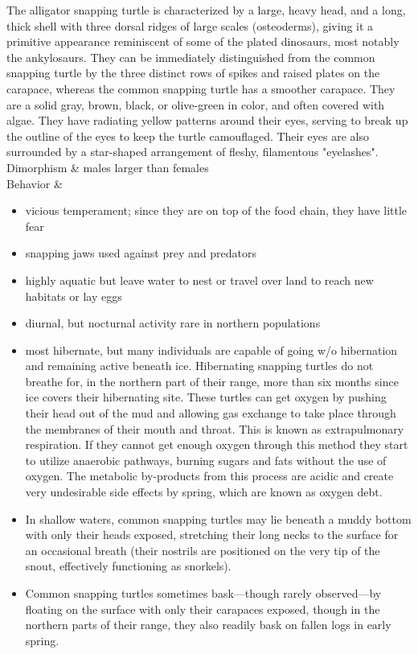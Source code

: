 \begin{center}
\begin{longtabu}
	The alligator snapping turtle is characterized by a large, heavy head, and a long, thick shell with three dorsal ridges of large scales (osteoderms), giving it a primitive appearance reminiscent of some of the plated dinosaurs, most notably the ankylosaurs. They can be immediately distinguished from the common snapping turtle by the three distinct rows of spikes and raised plates on the carapace, whereas the common snapping turtle has a smoother carapace. They are a solid gray, brown, black, or olive-green in color, and often covered with algae. They have radiating yellow patterns around their eyes, serving to break up the outline of the eyes to keep the turtle camouflaged. Their eyes are also surrounded by a star-shaped arrangement of fleshy, filamentous "eyelashes".
	 \\
	\hline
	Dimorphism & 
	males larger than females
	\\
	\hline
	Behavior & 
	\begin{itemize}[noitemsep]
		\item vicious temperament; since they are on top of the food chain, they have little fear
		\item snapping jaws used against prey and predators
		\item highly aquatic but leave water to nest or travel over land to reach new habitats or lay eggs
		\item diurnal, but nocturnal activity rare in northern populations
		\item most hibernate, but many individuals are capable of going w/o hibernation and remaining active beneath ice. Hibernating snapping turtles do not breathe for, in the northern part of their range, more than six months since ice covers their hibernating site. These turtles can get oxygen by pushing their head out of the mud and allowing gas exchange to take place through the membranes of their mouth and throat. This is known as extrapulmonary respiration. If they cannot get enough oxygen through this method they start to utilize anaerobic pathways, burning sugars and fats without the use of oxygen. The metabolic by-products from this process are acidic and create very undesirable side effects by spring, which are known as oxygen debt.
		\item In shallow waters, common snapping turtles may lie beneath a muddy bottom with only their heads exposed, stretching their long necks to the surface for an occasional breath (their nostrils are positioned on the very tip of the snout, effectively functioning as snorkels).
		\item Common snapping turtles sometimes bask---though rarely observed---by floating on the surface with only their carapaces exposed, though in the northern parts of their range, they also readily bask on fallen logs in early spring. 


\end{itemize}
\end{longtabu}
\end{center}
